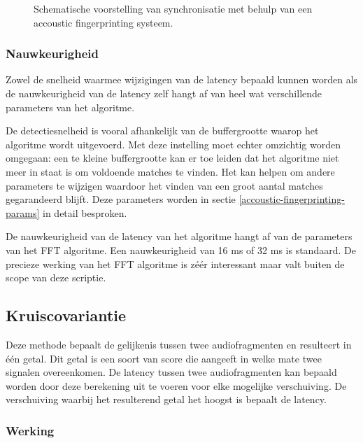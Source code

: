 \begin{figure}[h]
	\captionsetup{width=0.7\textwidth}
	\caption[Schema synchronisatie met fingerprinting]{Schematische voorstelling van synchronisatie met behulp van een accoustic fingerprinting systeem.}
	\advance\parskip0.5cm
	
	\advance\parskip1cm
\end{figure}
\vspace{2.5cm}

\subsubsection{Nauwkeurigheid}

Zowel de snelheid waarmee wijzigingen van de latency bepaald kunnen worden als de nauwkeurigheid van de latency zelf hangt af van heel wat verschillende parameters van het algoritme.

De detectiesnelheid is vooral afhankelijk van de buffergrootte waarop het algoritme wordt uitgevoerd. Met deze instelling moet echter omzichtig worden omgegaan: een te kleine buffergrootte kan er toe leiden dat het algoritme niet meer in staat is om voldoende matches te vinden. Het kan helpen om andere parameters te wijzigen waardoor het vinden van een groot aantal matches gegarandeerd blijft. Deze parameters worden in sectie \ref{accoustic-fingerprinting-params} in detail besproken.

De nauwkeurigheid van de latency van het algoritme hangt af van de parameters van het FFT algoritme. Een nauwkeurigheid van 16 ms of 32 ms is standaard. De precieze werking van het FFT algoritme is zéér interessant maar valt buiten de scope van deze scriptie.

\subsection{Kruiscovariantie}
\label{kruiscovariantie}

Deze methode bepaalt de gelijkenis tussen twee audiofragmenten en resulteert in één getal. Dit getal is een soort van score die aangeeft in welke mate twee signalen overeenkomen. De latency tussen twee audiofragmenten kan bepaald worden door deze berekening uit te voeren voor elke mogelijke verschuiving. De verschuiving waarbij het resulterend getal het hoogst is bepaalt de latency.

\subsubsection{Werking}

